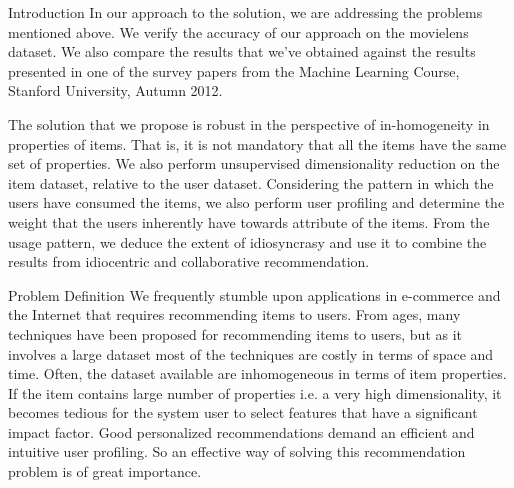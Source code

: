 \documentclass{report}
\begin{document}
\begin{projChapter}{Introduction}
In our approach to the solution, we are addressing the problems mentioned above. We verify the accuracy of our approach on the movielens dataset. We also compare the results that we've obtained against the results presented in one of the survey papers from the Machine Learning Course, Stanford University, Autumn 2012.

The solution that we propose is robust in the perspective of in-homogeneity in properties of items. That is, it is not mandatory that all the items have the same set of properties. We also perform unsupervised dimensionality reduction on the item dataset, relative to the user dataset. Considering the pattern in which the users have consumed the items, we also perform user profiling and determine the weight that the users inherently have towards attribute of the items. From the usage pattern, we deduce the extent of idiosyncrasy and use it to combine the results from idiocentric and collaborative recommendation.
\end{projChapter}

\begin{projChapter}{Problem Definition}
 We frequently stumble upon applications in e-commerce and the Internet that requires recommending items to users. From ages, many techniques have been proposed for recommending items to users, but as it involves a large dataset most of the techniques are costly in terms of space and time. Often, the dataset available are inhomogeneous in terms of item properties. If the item contains large number of properties i.e. a very high dimensionality, it becomes tedious for the system user to select features that have a significant impact factor. Good personalized recommendations demand an efficient and intuitive user profiling. So an effective way of solving this recommendation problem is of great importance. 
\end{projChapter}
\end{document}
